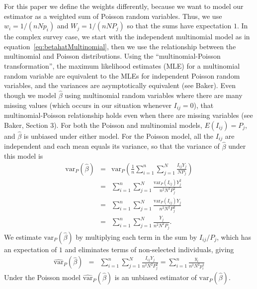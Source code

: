 \documentclass[AMA,STIX1COL]{WileyNJD-v2}
\begin{document}
For this paper we define the weights differently, because we want to model our estimator as a weighted sum of Poisson random variables.
Thus, we use $w_i = 1/(nNp_i)$ and $W_j= 1/(nNP_j)$ so that the sums have expectation $1$.
In the complex survey case,
we start with the independent multinomial model as in equation~\ref{eq:betahatMultinomial}, then we use the relationship between the multinomial and Poisson distributions.
Using the ``multinomial-Poisson transformation'', the maximum
likelihood estimates (MLE) for a multinomial random variable are equivalent to the MLEs for independent Poisson random variables, and
the variances are asymptotically equivalent (see Baker\cite{Baker:1994}).
Even though we model $\hat{\beta}$ using multinomial random variables where there are many missing values (which occurs in our situation whenever $I_{ij}=0$),
that multinomial-Poisson relationship holds even when there are missing variables (see Baker\cite{Baker:1994}, Section 3).
For both the Poisson and multinomial models, $E(I_{ij}) = P_j$, and $\hat{\beta}$ is unbiased under either model.
For the Poisson model, all the $I_{ij}$ are independent and each mean equals its variance, so that the variance of $\hat{\beta}$ under this model is
\begin{eqnarray*}
\textrm{var}_P \left(\hat{\beta} \right) & = & \textrm{var}_P \left(  \frac{1}{n}  \sum_{i=1}^{n} \sum_{j=1}^{N}  \frac{ I_{ij}  Y_j}{N P_j} \right)  \\
& = &    \sum_{i=1}^{n} \sum_{j=1}^{N}  \frac{ \textrm{var}_P( I_{ij})  Y_j^2}{n^2 N^2 P_j^2}  \\
& = &    \sum_{i=1}^{n} \sum_{j=1}^{N}  \frac{ \textrm{var}_P( I_{ij})  Y_j}{n^2 N^2 P_j^2}  \\
& = &    \sum_{i=1}^{n} \sum_{j=1}^{N}  \frac{   Y_j}{n^2 N^2 P_j}.
\end{eqnarray*}
We estimate $\textrm{var}_P \left(\hat{\beta} \right)$ by multiplying each term in the sum by $I_{ij}/P_j$, which has an expectation of $1$ and eliminates terms of non-selected individuals, giving
\begin{eqnarray}
\widehat{\textrm{var}}_P \left(\hat{\beta} \right)
& = &   \sum_{i=1}^{n} \sum_{j=1}^{N}  \frac{ I_{ij}  Y_j}{n^2 N^2 P_j^2}  =  \sum_{i=1}^{n}  \frac{  y_i}{n^2 N^2 p_i^2} \label{eq:hatvarbetahat1}
\end{eqnarray}
Under the Poisson model $\widehat{\textrm{var}}_P \left(\hat{\beta} \right)$ is an unbiased estimator of $\textrm{var}_P \left(\hat{\beta} \right)$.
\end{document}
